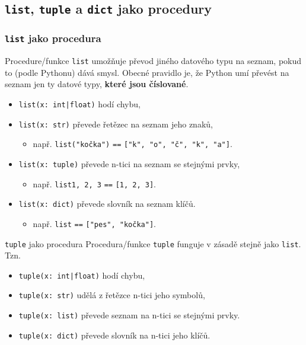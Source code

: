 \subsection[\texttt{list}, \texttt{tuple} a \texttt{dict} jako
procedury]{\texttt{list}, \texttt{tuple} a \texttt{dict} jako procedury}

\begin{frame}
 \frametitle{\texttt{list} jako procedura}
 Procedure/funkce \texttt{\alert{list}} umožňuje převod jiného datového typu na
 seznam, pokud to (podle Pythonu) dává smysl. Obecné pravidlo je, že Python umí
 převést na seznam jen ty datové typy, \textbf{které jsou číslované}.
 \begin{itemize}
  \item<1-> \texttt{list(x: \alert{int}|\alert{float})} hodí chybu,
  \item<2-> \texttt{list(x: \alert{str})} převede řetězec na seznam jeho znaků,
   \begin{itemize}
    \item např. \texttt{list("kočka")} \texttt{==} \texttt{["k", "o", "č", "k",
     "a"]}.
   \end{itemize}
  \item<3-> \texttt{list(x: \alert{tuple})} převede n-tici na seznam se stejnými
   prvky,
   \begin{itemize}
    \item např. \texttt{list\mlb{(}\mlg{(}1, 2, 3\mlg{)}\mlb{)}} \texttt{==}
     \texttt{[1, 2, 3]}.
   \end{itemize}
  \item<4-> \texttt{list(x: \alert{dict})} převede slovník na seznam klíčů.
   \begin{itemize}
    \item např. \texttt{list\mlb{(}\mlb{)}} \texttt{==} \texttt{["pes", "kočka"]}.
   \end{itemize}
 \end{itemize}
\end{frame}

\begin{frame}{\texttt{tuple} jako procedura}
 Procedura/funkce \alert{\texttt{tuple}} funguje v zásadě stejně jako
 \texttt{list}. Tzn.
 \pause
 \begin{itemize}
  \item \texttt{tuple(x: \alert{int}|\alert{float})} hodí chybu,
  \item \texttt{tuple(x: \alert{str})} udělá z řetězce n-tici jeho symbolů,
  \item \texttt{tuple(x: \alert{list})} převede seznam na n-tici se stejnými
   prvky.
  \item \texttt{tuple(x: \alert{dict})} převede slovník na n-tici jeho klíčů.
 \end{itemize}
\end{frame}

